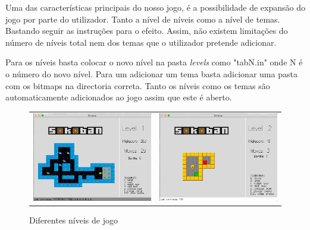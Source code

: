 \documentclass[12pt,a4paper]{report}
\begin{document}
\hfill

\hfill

Uma das características principais do nosso jogo, é a possibilidade de expansão do jogo por parte do utilizador. Tanto a nível de níveis como a nível de temas. Bastando seguir as instruções para o efeito. Assim, não existem limitações do número de níveis total nem dos temas que o utilizador pretende adicionar.

Para os níveis basta colocar o novo nível na pasta \emph{levels} como "tabN.in" onde N é o número do novo nível. Para um adicionar um tema basta adicionar uma pasta com os bitmaps na directoria correta. Tanto os níveis como os temas são automaticamente adicionados ao jogo assim que este é aberto.

\hfill

\begin{figure}[htb]
\centering
  \begin{tabular}{@{}cc@{}}
    \includegraphics[scale=0.30]{images/print7.png} &
    \includegraphics[scale=0.30]{images/print12.png}
  \end{tabular}
  \caption{Diferentes níveis de jogo}
\end{figure}
\end{document}
